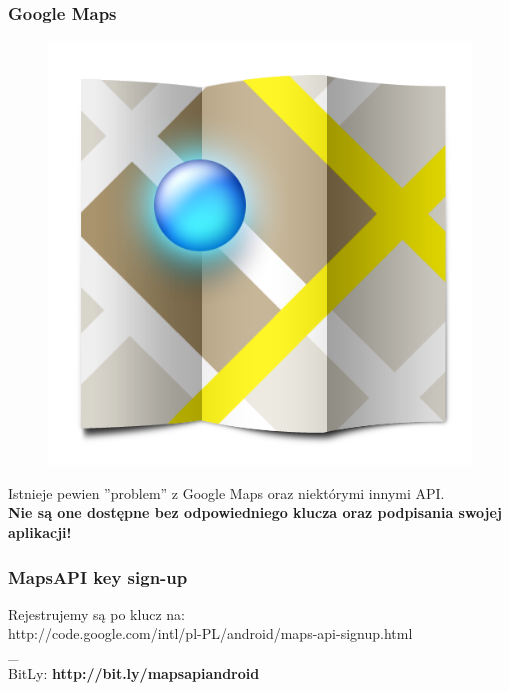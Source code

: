 \documentclass{beamer}
\begin{document}
\begin{frame}
\frametitle{Google Maps}

\begin{figure}[tc]
  \centering
  \includegraphics[height=0.45\textheight,keepaspectratio=true]{images/maps_icon}
\end{figure}

Istnieje pewien ''problem'' z Google Maps oraz niektórymi innymi API. \\
\textbf{Nie są one dostępne bez odpowiedniego klucza oraz podpisania swojej aplikacji!}
\end{frame}

\begin{frame}
 
\end{frame}


\begin{frame}
 \frametitle{MapsAPI key sign-up}
  \centering Rejestrujemy są po klucz na: \\
  \centering http://code.google.com/intl/pl-PL/android/maps-api-signup.html \\
  _\\
  \centering BitLy: \textbf{http://bit.ly/mapsapiandroid}\\
\end{frame}
\end{document}
